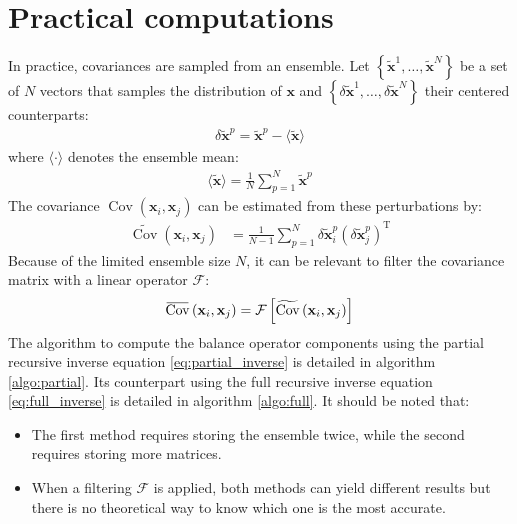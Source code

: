\documentclass[12pt]{scrartcl}
\newcommand{\overbar}[1]{\mkern 1.5mu\overline{\mkern-1.5mu#1\mkern-1.5mu}\mkern 1.5mu}
\DeclareMathOperator{\Cov}{Cov}
\begin{document}
\section{Practical computations}
In practice, covariances are sampled from an ensemble. Let $\left\{\widetilde{\mathbf{x}}^1,\dots,\widetilde{\mathbf{x}}^N\right\}$ be a set of $N$ vectors that samples the distribution of $\mathbf{x}$ and $\left\{\delta \widetilde{\mathbf{x}}^1,\dots,\delta \widetilde{\mathbf{x}}^N\right\}$ their centered counterparts:
\begin{align}
\delta \widetilde{\mathbf{x}}^p = \widetilde{\mathbf{x}}^p - \langle \widetilde{\mathbf{x}} \rangle
\end{align}
where $\langle \cdot \rangle$ denotes the ensemble mean:
\begin{align}
\label{eq:exp_estim}
\langle \widetilde{\mathbf{x}} \rangle = \frac{1}{N} \sum_{p=1}^N \widetilde{\mathbf{x}}^p
\end{align}
The covariance $\Cov \left(\mathbf{x}_i,\mathbf{x}_j\right)$ can be estimated from these perturbations by:
\begin{align}
\label{eq:cov_estim}
\widetilde{\Cov}\left(\mathbf{x}_i,\mathbf{x}_j\right) & = \frac{1}{N-1} \sum_{p=1}^N \delta \widetilde{\mathbf{x}}^p_i \left(\delta \widetilde{\mathbf{x}}^p_j\right)^\mathrm{T}
\end{align}
Because of the limited ensemble size $N$, it can be relevant to filter the covariance matrix with a linear operator $\mathcal{F}$:
\begin{align}
\label{eq:cov_filter}
\overbar{\Cov}\left(\mathbf{x}_i,\mathbf{x}_j\right) = \mathcal{F} \left[\widetilde{\Cov}\left(\mathbf{x}_i,\mathbf{x}_j\right)\right]
\end{align}
$ $\\
The algorithm to compute the balance operator components using the partial recursive inverse equation \eqref{eq:partial_inverse} is detailed in algorithm \ref{algo:partial}. Its counterpart using the full recursive inverse equation \eqref{eq:full_inverse} is detailed in algorithm \ref{algo:full}. It should be noted that:
\begin{itemize}
\item The first method requires storing the ensemble twice, while the second requires storing more matrices.
\item When a filtering $\mathcal{F}$ is applied, both methods can yield different results but there is no theoretical way to know which one is the most accurate.
\end{itemize}
\end{document}
